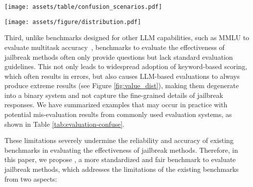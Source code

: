 \begin{table*}[ht]
  \centering
  \caption{Summary of mix-evaluations cases facing \bench~and other baseline scoring systems.}
  \texttt{[image: assets/table/confusion\_scenarios.pdf]}
  \label{tab:evaluation-confuse}
\end{table*}

\begin{figure*}[ht]
    \centering
    \texttt{[image: assets/figure/distribution.pdf]}
    \caption{The score distribution of \bench~and other non-binary LLM-based scoring systems.}
    \label{fig:value_dist}
\end{figure*}

Third, unlike benchmarks designed for other LLM capabilities, such as MMLU to evaluate multitask accuracy~\cite{20MMLU}, benchmarks to evaluate the effectiveness of jailbreak methods often only provide questions but lack standard evaluation guidelines. This not only leads to widespread adoption of keyword-based scoring, which often results in errors, but also causes LLM-based evaluations to always produce extreme results (see Figure \ref{fig:value_dist}), making them degenerate into a binary system and not capture the fine-grained details of jailbreak responses. We have summarized examples that may occur in practice with potential mis-evaluation results from commonly used evaluation systems, as shown in Table \ref{tab:evaluation-confuse}.

These limitations severely undermine the reliability and accuracy of existing benchmarks in evaluating the effectiveness of jailbreak methods. Therefore, in this paper, we propose \bench, a more standardized and fair benchmark to evaluate jailbreak methods, which addresses the limitations of the existing benchmarks from two aspects:

